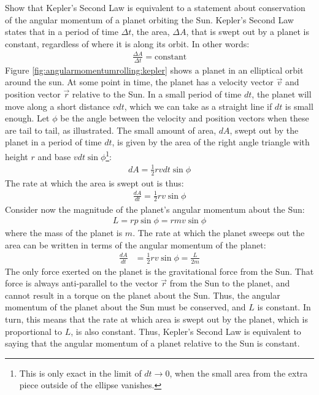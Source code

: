 \begin{example}{Show that Kepler's Second Law is equivalent to a statement about conservation of the angular momentum of a planet orbiting the Sun.}
Kepler's Second Law states that in a period of time $\Delta t$, the area, $\Delta A$, that is swept out by a planet is constant, regardless of where it is along its orbit. In other words:
\begin{align*}
\frac{\Delta A}{\Delta t} = \text{constant}
\end{align*}
 Figure \ref{fig:angularmomentumrolling:kepler} shows a planet in an elliptical orbit around the sun.
At some point in time, the planet has a velocity vector $\vec v$ and position vector $\vec r$ relative to the Sun. In a small period of time $dt$, the planet will move along a short distance $vdt$, which we can take as a straight line if $dt$ is small enough. Let $\phi$ be the angle between the velocity and position vectors when these are tail to tail, as illustrated. 
%
The small amount of area, $dA$, swept out by the planet in a period of time $dt$, is given by the area of the right angle triangle with height $r$ and base $vdt\sin\phi$\footnote{This is only exact in the limit of $dt\to 0$, when the small area from the extra piece outside of the ellipse vanishes.}:
\begin{align*}
dA = \frac{1}{2} r vdt\sin\phi
\end{align*}
The rate at which the area is swept out is thus:
\begin{align*}
\frac{dA}{dt} =  \frac{1}{2} r v\sin\phi
\end{align*}
Consider now the magnitude of the planet's angular momentum about the Sun:
\begin{align*}
L = rp\sin\phi = rmv\sin\phi
\end{align*}
where the mass of the planet is $m$. The rate at which the planet sweeps out the area can be written in terms of the angular momentum of the planet:
\begin{align*}
\frac{dA}{dt} &=  \frac{1}{2} r v\sin\phi = \frac{L}{2m}
\end{align*}
The only force exerted on the planet is the gravitational force from the Sun. That force is always anti-parallel to the vector $\vec r$ from the Sun to the planet, and cannot result in a torque on the planet about the Sun. Thus, the angular momentum of the planet about the Sun must be conserved, and $L$ is constant. In turn, this means that the rate at which area is swept out by the planet, which is proportional to $L$, is also constant. Thus, Kepler's Second Law is equivalent to saying that the angular momentum of a planet relative to the Sun is constant. 
\end{example}

